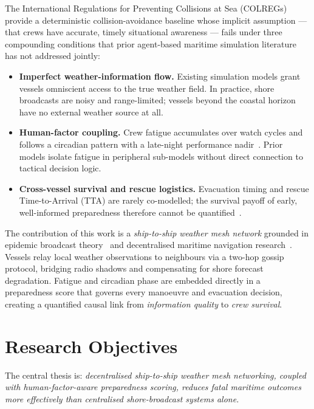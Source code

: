 \documentclass[cameraready]{Interspeech}
\begin{document}
The International Regulations for Preventing Collisions at Sea (COLREGs)~\cite{colregs1972} provide a deterministic collision-avoidance baseline whose implicit assumption — that crews have accurate, timely situational awareness — fails under three compounding conditions that prior agent-based maritime simulation literature~\cite{tam2010,silveira2013,zhang2015}
has not addressed jointly:

\begin{itemize}
    \item \textbf{Imperfect weather-information flow.} Existing simulation models grant vessels omniscient access to the true weather field. In practice, shore broadcasts are noisy and range-limited; vessels beyond the coastal horizon have no external weather source at all.

    \item \textbf{Human-factor coupling.} Crew fatigue accumulates over watch cycles and follows a circadian pattern with a late-night performance nadir~\cite{chauvin2013}. Prior models isolate fatigue in peripheral sub-models without direct connection to tactical decision logic.

    \item \textbf{Cross-vessel survival and rescue logistics.} Evacuation timing and rescue Time-to-Arrival (TTA) are rarely co-modelled; the survival payoff of early, well-informed preparedness therefore cannot be quantified~\cite{goerlandt2014}.
\end{itemize}


The contribution of this work is a \emph{ship-to-ship weather mesh network} grounded in epidemic broadcast theory~\cite{demers1987} and decentralised maritime navigation research~\cite{naus2016}. Vessels relay local weather observations to neighbours via a two-hop gossip protocol, bridging radio shadows and compensating for shore forecast degradation. Fatigue and circadian phase are embedded directly in a preparedness score that governs every manoeuvre and evacuation decision, creating a quantified causal link from \emph{information quality} to \emph{crew survival}.

\section{Research Objectives}
\label{sec:goal}

The central thesis is: \emph{decentralised ship-to-ship weather mesh networking, coupled with human-factor-aware preparedness scoring, reduces fatal maritime outcomes more effectively than centralised shore-broadcast systems alone.}
\end{document}

